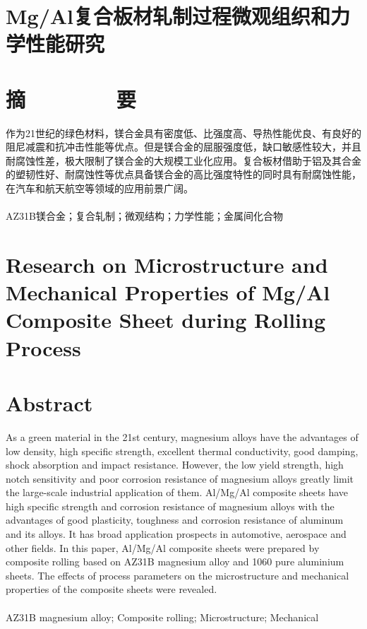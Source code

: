 \section*{\heiti Mg/Al复合板材轧制过程微观组织和力学性能研究}
\section*{\heiti 摘\ \ \ \ \ \ \ \ 要}

作为21世纪的绿色材料，镁合金具有密度低、比强度高、导热性能优良、有良好的阻尼减震和抗冲击性能等优点。但是镁合金的屈服强度低，缺口敏感性较大，并且耐腐蚀性差，极大限制了镁合金的大规模工业化应用。复合板材借助于铝及其合金的塑韧性好、耐腐蚀性等优点具备镁合金的高比强度特性的同时具有耐腐蚀性能，在汽车和航天航空等领域的应用前景广阔。
\\
\\
AZ31B镁合金；复合轧制；微观结构；力学性能；金属间化合物

\clearpage


\section*{\bfseries Research on Microstructure and Mechanical Properties of Mg/Al Composite Sheet during Rolling Process}



\section*{\bfseries Abstract}

As a green material in the 21st century, magnesium alloys have the advantages of low density, high specific strength, excellent thermal conductivity, good damping, shock absorption and impact resistance. However, the low yield strength, high notch sensitivity and poor corrosion resistance of magnesium alloys greatly limit the large-scale industrial application of them. Al/Mg/Al composite sheets have high specific strength and corrosion resistance of magnesium alloys with the advantages of good plasticity, toughness and corrosion resistance of aluminum and its alloys. It has broad application prospects in automotive, aerospace and other fields. In this paper, Al/Mg/Al composite sheets were prepared by composite rolling based on AZ31B magnesium alloy and 1060 pure aluminium sheets. The effects of process parameters on the microstructure and mechanical properties of the composite sheets were revealed.
	\\
	\\
	AZ31B magnesium alloy; Composite rolling; Microstructure; Mechanical

\clearpage




